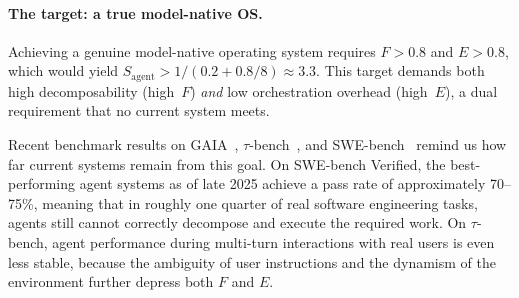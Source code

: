 \paragraph{The target: a true model-native OS.}
Achieving a genuine model-native operating system requires $F > 0.8$ and $E > 0.8$, which would yield $S_{\mathrm{agent}} > 1/(0.2 + 0.8/8) \approx 3.3$.
This target demands both high decomposability (high~$F$) \textit{and} low orchestration overhead (high~$E$), a dual requirement that no current system meets.

Recent benchmark results on GAIA~\cite{gaia2023}, $\tau$-bench~\cite{taubench2024}, and SWE-bench~\cite{swebench2023} remind us how far current systems remain from this goal.
On SWE-bench Verified, the best-performing agent systems as of late 2025 achieve a pass rate of approximately 70--75\%, meaning that in roughly one quarter of real software engineering tasks, agents still cannot correctly decompose and execute the required work.
On $\tau$-bench, agent performance during multi-turn interactions with real users is even less stable, because the ambiguity of user instructions and the dynamism of the environment further depress both $F$ and $E$.
